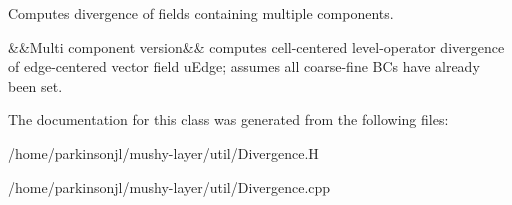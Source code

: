 Computes divergence of fields containing multiple components. 

\&\&Multi component version\&\& computes cell-\/centered level-\/operator divergence of edge-\/centered vector field u\+Edge; assumes all coarse-\/fine BC\textquotesingle{}s have already been set. 

The documentation for this class was generated from the following files\+:\begin{DoxyCompactItemize}
\item 
/home/parkinsonjl/mushy-\/layer/util/Divergence.\+H\item 
/home/parkinsonjl/mushy-\/layer/util/Divergence.\+cpp\end{DoxyCompactItemize}
